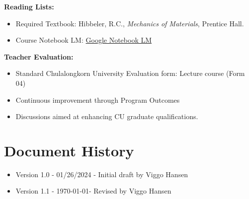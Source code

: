 \documentclass[12pt]{article}
\begin{document}
\begin{enumerate}
\textbf{Reading Lists:}
\begin{itemize}
    \item Required Textbook: Hibbeler, R.C., \textit{Mechanics of Materials}, Prentice Hall.
    \item Course Notebook LM: \href{https://notebooklm.google.com/notebook/eb161394-bf08-4333-b72a-5e132e2746ff}{Google Notebook LM}
\end{itemize}

\textbf{Teacher Evaluation:}
\begin{itemize}
    \item Standard Chulalongkorn University Evaluation form: Lecture course (Form 04)
    \item Continuous improvement through Program Outcomes
    \item Discussions aimed at enhancing CU graduate qualifications.
\end{itemize}
\end{enumerate}

\section*{Document History}
\begin{itemize}
    \item Version 1.0 - 01/26/2024 - Initial draft by Viggo Hansen
    \item Version 1.1 - \today - Revised by Viggo Hansen
\end{itemize}
\label{LastPage}
\end{document}
